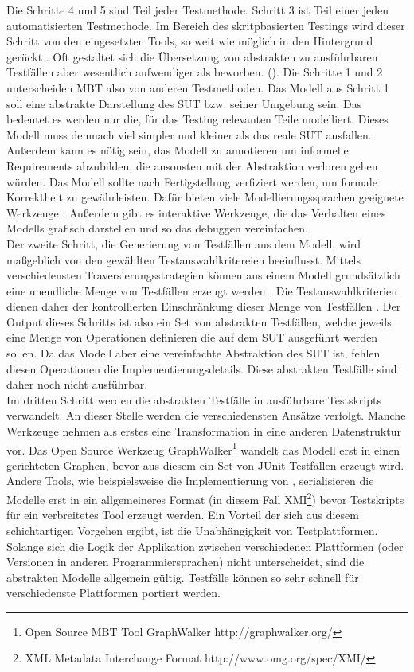 Die Schritte 4 und 5 sind Teil jeder Testmethode. Schritt 3 ist Teil einer jeden automatisierten Testmethode. Im Bereich des skritpbasierten Testings wird dieser Schritt von den eingesetzten Tools, so weit wie möglich in den Hintergrund gerückt . Oft gestaltet sich die Übersetzung von abstrakten zu ausführbaren Testfällen aber wesentlich aufwendiger als beworben. ().
Die Schritte 1 und 2 unterscheiden MBT also von anderen Testmethoden. Das Modell aus Schritt 1 soll eine abstrakte Darstellung des SUT bzw. seiner Umgebung sein. Das bedeutet es werden nur die, für das Testing relevanten Teile modelliert. Dieses Modell muss demnach viel simpler und kleiner als das reale SUT ausfallen. Außerdem kann es nötig sein, das Modell zu annotieren um informelle Requirements abzubilden, die ansonsten mit der Abstraktion verloren gehen würden. Das Modell sollte nach Fertigstellung verfiziert werden, um formale Korrektheit zu gewährleisten. Dafür bieten viele Modellierungssprachen geeignete Werkzeuge \cite{kaneiwa_consistency_2006}. Außerdem gibt es interaktive Werkzeuge, die das Verhalten eines Modells grafisch darstellen und so das debuggen vereinfachen.\\
Der zweite Schritt, die Generierung von Testfällen aus dem Modell, wird maßgeblich von den gewählten Testauswahlkritereien beeinflusst. Mittels verschiedensten Traversierungsstrategien können aus einem Modell grundsätzlich eine unendliche Menge von Testfällen erzeugt werden \cite{utting_practical_2007}. Die Testauswahlkriterien dienen daher der kontrollierten Einschränkung dieser Menge von Testfällen . Der Output dieses Schritts ist also ein Set von abstrakten Testfällen, welche jeweils eine Menge von Operationen definieren die auf dem SUT ausgeführt werden sollen. Da das Modell aber eine vereinfachte Abstraktion des SUT ist, fehlen diesen Operationen die Implementierungsdetails. Diese abstrakten Testfälle sind daher noch nicht ausführbar.\\
Im dritten Schritt werden die abstrakten Testfälle in ausführbare Testskripts verwandelt. An dieser Stelle werden die verschiedensten Ansätze verfolgt. Manche Werkzeuge nehmen als erstes eine Transformation in eine anderen Datenstruktur vor. Das Open Source Werkzeug GraphWalker\footnote{Open Source MBT Tool GraphWalker http://graphwalker.org/} wandelt das Modell erst in einen gerichteten Graphen, bevor aus diesem ein Set von JUnit-Testfällen erzeugt wird. Andere Tools, wie beispielsweise die Implementierung von \cite{pinheiro_model-based_2013}, serialisieren die Modelle erst in ein allgemeineres Format (in diesem Fall XMI\footnote{XML Metadata Interchange Format http://www.omg.org/spec/XMI/}) bevor Testskripts für ein verbreitetes Tool erzeugt werden. Ein Vorteil der sich aus diesem schichtartigen Vorgehen ergibt, ist die Unabhängigkeit von Testplattformen. Solange sich die Logik der Applikation zwischen verschiedenen Plattformen (oder Versionen in anderen Programmiersprachen) nicht unterscheidet, sind die abstrakten Modelle allgemein gültig. Testfälle können so sehr schnell für verschiedenste Plattformen portiert werden.\\

